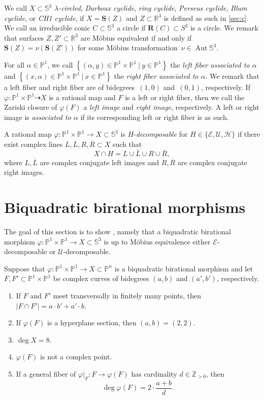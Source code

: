 \documentclass[11pt]{article}
\newenvironment{claims}{\begin{enumerate}[topsep=0pt,itemsep=0pt,leftmargin=8mm,label=\textnormal{\textbf{(\alph*)}},ref=(\alph*)]}{\end{enumerate}}
\newcommand{\R}{\mathbb{R}}
\renewcommand{\P}{\mathbb{P}}
\renewcommand{\S}{\mathbb{S}}
\newcommand{\Z}{\mathbb{Z}}
\newcommand{\bR}{\mathbf{R}}
\newcommand{\bS}{\mathbf{S}}
\newcommand{\cE}{\mathcal{E}}
\newcommand{\cU}{\mathcal{U}}
\newcommand{\cH}{\mathcal{H}}
\newcommand{\oL}{{\overline{L}}}
\newcommand{\oR}{{\overline{R}}}
\renewcommand{\c}{\colon}
\newcommand{\dto}{\dasharrow}
\newcommand{\aut}{\operatorname{Aut}}
\newcommand{\set}[2]{\left\{#1 ~|~ #2\right\}}
\newcommand{\df}{\emph}
\newcommand{\resp}{respectively}
\newcommand{\st}{such that }
\begin{document}
We call $X\subset \S^3$
\df{$\lambda$-circled},
\df{Darboux cyclide},
\df{ring cyclide},
\df{Perseus cyclide},
\df{Blum cyclide}, or
\df{CH1 cyclide},
if $X=\bS(Z)$ and $Z\subset\R^3$ is defined as such in \textsection\ref{sec:c}.
We call an irreducible conic $C\subset\S^3$ a circle if $\bR(C)\subset S^3$ is a circle.
We remark that surfaces $Z,Z'\subset \R^3$
are M\"obius equivalent if and only if
$\bS(Z)=\nu(\bS(Z'))$ for some M\"obius transformation~$\nu\in\aut\S^3$.



For all $\alpha\in\P^1$, we call
$\set{(\alpha,y)\in\P^1\times\P^1}{y\in\P^1}$
the \df{left fiber associated to $\alpha$}
and
$\set{(x,\alpha)\in\P^1\times\P^1}{x\in\P^1}$
the \df{right fiber associated to $\alpha$}.
We remark that a left fiber and right fiber are of bidegrees~$(1,0)$ and~$(0,1)$, \resp.
If $\varphi\c \P^1\times\P^1\dto X$ is a rational map
and $F$ is a left or right fiber,
then we call the Zariski closure of $\varphi(F)$
a \df{left image} and \df{right image}, \resp.
A left or right image is \df{associated to $\alpha$}
if its corresponding left or right fiber is as such.

A rational map $\varphi\c\P^1\times\P^1\to X\subset\S^3$
is $H$-\df{decomposable}
for $H\in\{\cE,\cU,\cH\}$
if there exist
complex lines $L,\oL,R,\oR\subset X$
\st
\[
X\cap H=L\cup\oL\cup R\cup \oR,
\]
where $L,\oL$ are complex conjugate left images
and $R,\oR$ are complex conjugate right images.


\section{Biquadratic birational morphisms}
\label{sec:morphism}

The goal of this section is to show ,
namely that a biquadratic birational morphism
$\varphi\c\P^1\times\P^1\to X\subset \S^3$ is up to M\"obius equivalence
either $\cE$-decomposable or $\cU$-decomposable.

\begin{lemma}
\label{lem:Y}
Suppose that $\varphi\c\P^1\times\P^1\to X\subset\P^n$ is a biquadratic birational morphism
and let $F,F'\subset\P^1\times\P^1$ be complex curves of bidegrees $(a,b)$ and $(a',b')$,
\resp.
\begin{claims}
\item\label{lem:Y:A}
If $F$ and $F'$ meet transversally in finitely many points,
then $|F\cap F'|=a\cdot b'+a'\cdot b$.

\item\label{lem:Y:B}
If $\varphi(F)$ is a hyperplane section, then $(a,b)=(2,2)$.

\item\label{lem:Y:C}
$\deg X=8$.

\item\label{lem:Y:D}
$\varphi(F)$ is not a complex point.

\item\label{lem:Y:E}
If a general fiber of $\varphi|_F\c F\to \varphi(F)$ has cardinality $d\in\Z_{>0}$,
then
\[
\deg \varphi(F)=2\cdot\frac{a+b}{d}.
\]
\end{claims}
\end{lemma}
\end{document}
